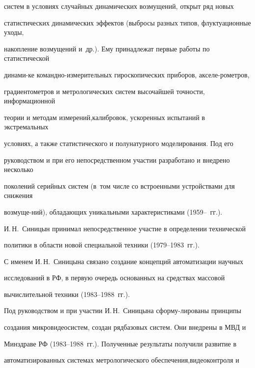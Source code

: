 систем в условиях случайных динамических возмущений, открыт ряд новых 

статистических динамических эффектов (выбросы разных типов, флуктуационные уходы, 

накопление возмущений и~др.). Ему принадлежат первые работы по статистической 

динами-\linebreak ке ко\-мандно-из\-ме\-ри\-тель\-ных гироскопических приборов, акселе-\linebreak рометров, 

градиентометров и метрологических систем высочай\-шей точности, информационной 

теории и методам измерений,\linebreak калибровок, ускоренных испытаний в экстремальных 

условиях, а также статистического и полунатурного моделирования. Под его 

руководством и при его непосредственном участии разработано и внедрено несколько 

поколений серийных систем (в~том чис\-ле со встроенными устройствами для снижения 

возмуще-\linebreak ний), обладающих уникальными характеристиками (1959--~гг.). 

И.\,Н.~Синицын принимал непосредственное участие в определении технической 

политики в области новой специальной техники (1979--1983~гг.). 

     

     С именем И.\,Н.~Синицына связано создание концепций автоматизации научных 

исследований в РФ, в первую очередь основанных на средствах массовой 

вычислительной техники (1983--1988~гг.). 

     

     Под руководством и при участии И.\,Н.~Синицына сформу-\linebreak лированы принципы 

создания микровидеосистем, создан ряд\linebreak базовых систем. Они внедрены в МВД и 

Минздраве РФ (1983--1988~гг.). Полученные результаты получили развитие в 

автоматизированных системах метрологического обеспечения,\linebreak видео\-контроля и 

